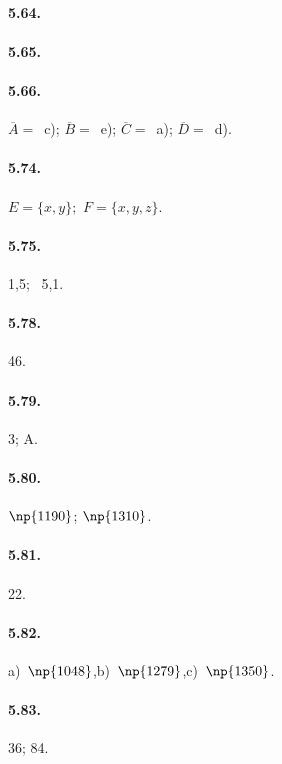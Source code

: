 \begin{multicols}{2}
\paragraph{5.64.} \boxD

\paragraph{5.65.} \boxB

\paragraph{5.66.} $\overline{A}=$~c); $\overline{B}=$~e); $\overline{C}=$~a); $\overline{D}=$~d).

\paragraph{5.74.} $E=\{x,y\}$;~$F=\{x,y,z\}$.

\paragraph{5.75.} 1,5;~ 5,1.

\paragraph{5.78.} 46.

\paragraph{5.79.} 3; A.

\paragraph{5.80.} $\np{1190}$; $\np{1310}$.

\paragraph{5.81.} 22.

\paragraph{5.82.} a)~$\np{1048}$,\quad b)~$\np{1279}$,\quad c)~$\np{1350}$.

\paragraph{5.83.} 36; 84.


\end{multicols}
